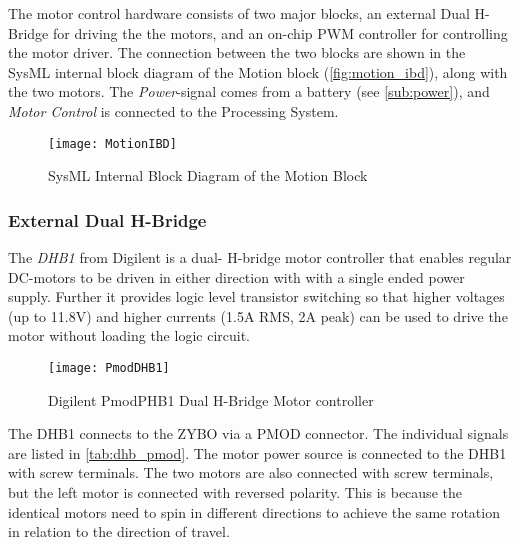 \documentclass[Main]{subfiles}
\begin{document}
		The motor control hardware consists of two major blocks, an external Dual H-Bridge for driving the the motors, and an on-chip PWM controller for controlling the motor driver.
		The connection between the two blocks are shown in the SysML internal block diagram of the Motion block (\autoref{fig:motion_ibd}), along with the two motors.
		The \emph{Power}-signal comes from a battery (see \autoref{sub:power}), and \emph{Motor Control} is connected to the Processing System.

		\begin{figure}[H]
			\centering
			\texttt{[image: MotionIBD]}
			\caption{SysML Internal Block Diagram of the Motion Block}
			\label{fig:motion_ibd}
		\end{figure}

		\subsubsection{External Dual H-Bridge} %
		\label{ssub:external_dual_h_bridge}
			
			The \emph{DHB1} from Digilent is a dual- H-bridge motor controller that enables regular DC-motors to be driven in either direction with with a single ended power supply.
			Further it provides logic level transistor switching so that higher voltages (up to 11.8V) and higher currents (1.5A RMS, 2A peak) can be used to drive the motor without loading the logic circuit.

			\begin{figure}[H]
				\centering
				\texttt{[image: PmodDHB1]}
				\caption{Digilent PmodPHB1 Dual H-Bridge Motor controller \cite{Digilent2013}}
				\label{fig:DHB1}
			\end{figure}

			The DHB1 connects to the ZYBO via a PMOD connector. The individual signals are listed in \autoref{tab:dhb_pmod}.
			The motor power source is connected to the DHB1 with screw terminals. The two motors are also connected with screw terminals, but the left motor is connected with reversed polarity.
			This is because the identical motors need to spin in different directions to achieve the same rotation in relation to the direction of travel.
\end{document}
